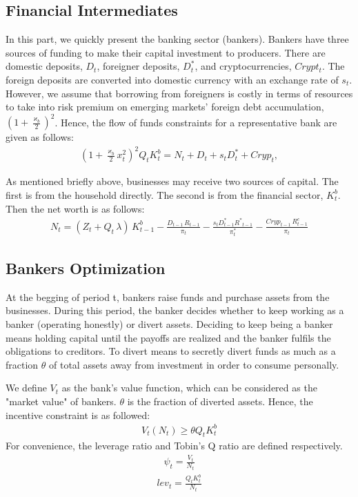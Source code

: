 \documentclass[12pt, a4paper]{article}
\begin{document}
\subsection{Financial Intermediates}
In this part, we quickly present the banking sector (bankers). Bankers have three sources of funding to make their capital investment to producers. There are domestic deposits, $D_t$, foreigner deposits, $D^*_t$, and cryptocurrencies, $Crypt_t$. The foreign deposits are converted into domestic currency with an exchange rate of $s_t$. However, we assume that borrowing from foreigners is costly in terms of resources to take into risk premium on emerging markets' foreign debt accumulation, $\left(1+\frac{\varkappa_{b}}{2}\right)^2$. Hence, the flow of funds constraints for a representative bank are given as follows:
\begin{align}
   \left(1+\frac{\varkappa_{b}}{2} x^2_t\right)^2 Q_t K^b_t = N_t+ D_{t} +s_t D^*_t+ Cryp_t ,
\end{align}

As mentioned briefly above, businesses may receive two sources of capital. The first is from the household directly. The second is from the financial sector, $K^b_t$. Then the net worth is as follows:
\begin{align}
 {N}_{t}= \left({Z}_{t}+{Q}_{t}\, {\lambda}\right)\, {K}^{b}_{t-1}-\frac{ {D}_{t-1}\, {R}_{t-1}}{{\pi}_{t}}-\frac{s_t D^{*}_{t-1}{R^{*}}_{t-1}}{\pi^*_t} -\frac{ {Cryp}_{t-1}\, {R}^c_{t-1}}{{\pi}_{t}}
\end{align}
\subsection{Bankers Optimization}
At the begging of period t, bankers raise funds and purchase assets from the businesses. During this period, the banker decides whether to keep working as a banker (operating honestly) or divert assets. Deciding to keep being a banker means holding capital until the payoffs are realized and the banker fulfils the obligations to creditors. To divert means to secretly divert funds as much as a fraction $\theta$ of total assets away from investment in order to consume personally. 

We define $V_t$ as the bank's value function, which can be considered as the "market value" of bankers. $\theta$ is the fraction of diverted assets. Hence, the incentive constraint is as followed:
\begin{align}
    V_t(N_t)\geq \theta Q_t K^b_t
\end{align}
For convenience, the leverage ratio and Tobin's Q ratio are defined respectively.
\begin{align}
    \psi_t = \frac{V_t}{N_t}
\end{align}
 \begin{align}
 lev_t=\frac{Q_t K^b_t}{N_t}    
 \end{align}
     
\end{document}
